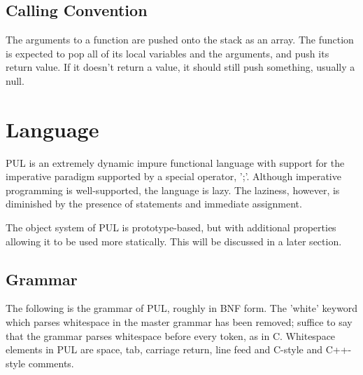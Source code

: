 \subsection{Calling Convention}

The arguments to a function are pushed onto the stack as an array. The function is expected to pop all of its local variables and the arguments, and push its return value. If it doesn't return a value, it should still push something, usually a null.



\section{Language}

PUL is an extremely dynamic impure functional language with support for the imperative paradigm supported by a special operator, ';'. Although imperative programming is well-supported, the language is lazy. The laziness, however, is diminished by the presence of statements and immediate assignment.

The object system of PUL is prototype-based, but with additional properties allowing it to be used more statically. This will be discussed in a later section.



\subsection{Grammar}

The following is the grammar of PUL, roughly in BNF form. The 'white' keyword which parses whitespace in the master grammar has been removed; suffice to say that the grammar parses whitespace before every token, as in C. Whitespace elements in PUL are space, tab, carriage return, line feed and C-style and C++-style comments.



